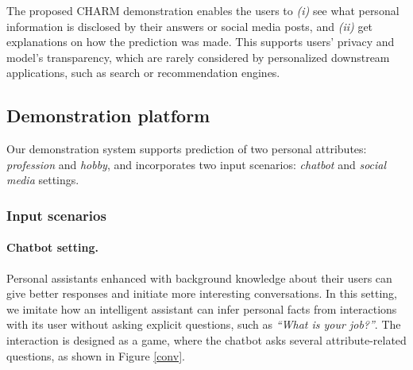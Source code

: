 The proposed CHARM demonstration enables the users to \emph{(i)} see what personal information is disclosed by their answers or social media posts, and \emph{(ii)} get explanations on how the prediction was made. This supports users' privacy and model's transparency, which are rarely considered by personalized downstream applications, such as search or recommendation engines.


\subsection{Demonstration platform}

\label{sec:demo}

Our demonstration system supports prediction of two personal attributes: \textit{profession} and \textit{hobby}, and incorporates two input scenarios: \emph{chatbot} and \emph{social media} settings.

\subsubsection{Input scenarios}

\paragraph{Chatbot setting.} Personal assistants enhanced with background knowledge about their users can give better responses and initiate more interesting conversations.
In this setting, we imitate how an intelligent assistant can infer personal facts from interactions with its user without asking explicit questions, such as \emph{``What is your job?''}. 
The interaction is designed as a game, where the chatbot asks several attribute-related questions, as shown in Figure \ref{conv}.

